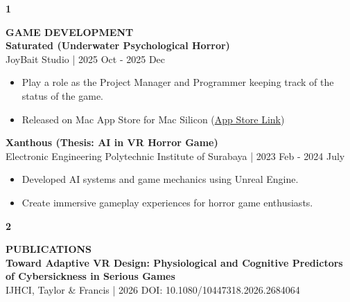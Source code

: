 \documentclass[11pt,a4paper]{article}
\begin{document}
\vspace{0.5cm}

\hspace{1cm}
\begin{minipage}[t]{18cm}

\begin{minipage}[t]{0.8cm}
{\Large\bfseries 1}
\end{minipage}%
\begin{minipage}[t]{17cm}
{\large\bfseries GAME DEVELOPMENT}\\[8pt]

\textbf{Saturated (Underwater Psychological Horror)}\\
{\small JoyBait Studio | 2025 Oct - 2025 Dec}
\begin{itemize}[leftmargin=*, nosep, itemsep=2pt, topsep=2pt]
    \item Play a role as the Project Manager and Programmer keeping track of the status of the game.
    \item Released on Mac App Store for Mac Silicon (\href{https://apps.apple.com/id/app/saturated/id6755347604}{\color{accent}\underline{App Store Link}})
\end{itemize}

\vspace{0.4cm}

\textbf{Xanthous (Thesis: AI in VR Horror Game)}\\
{\small Electronic Engineering Polytechnic Institute of Surabaya | 2023 Feb - 2024 July}
\begin{itemize}[leftmargin=*, nosep, itemsep=2pt, topsep=2pt]
    \item Developed AI systems and game mechanics using Unreal Engine.
    \item Create immersive gameplay experiences for horror game enthusiasts.
\end{itemize}

\end{minipage}

\vspace{0.8cm}

\begin{minipage}[t]{0.8cm}
{\Large\bfseries 2}
\end{minipage}%
\begin{minipage}[t]{17cm}
{\large\bfseries PUBLICATIONS}\\[8pt]

\textbf{Toward Adaptive VR Design: Physiological and Cognitive Predictors of Cybersickness in Serious Games}\\
{\small IJHCI, Taylor \& Francis | 2026 \textbar{} DOI: 10.1080/10447318.2026.2684064}


\end{minipage}
\end{minipage}
\end{document}
